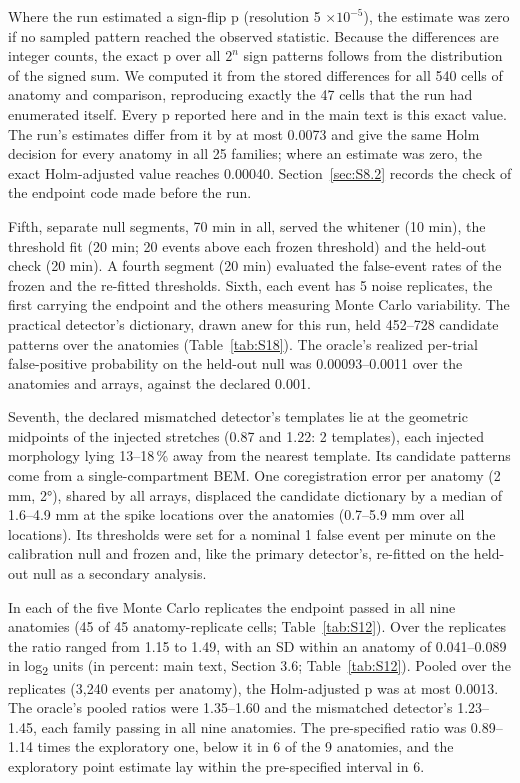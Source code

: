 \documentclass[preprint,12pt,authoryear,a4paper]{elsarticle}
\begin{document}
Where the run estimated a sign-flip p (resolution 5 $\times 10^{-5}$), the estimate was zero if no sampled pattern reached the observed statistic. Because the differences are integer counts, the exact p over all $2^{n}$ sign patterns follows from the distribution of the signed sum. We computed it from the stored differences for all 540 cells of anatomy and comparison, reproducing exactly the 47 cells that the run had enumerated itself. Every p reported here and in the main text is this exact value. The run's estimates differ from it by at most 0.0073 and give the same Holm decision for every anatomy in all 25 families; where an estimate was zero, the exact Holm-adjusted value reaches 0.00040. Section~\ref{sec:S8.2} records the check of the endpoint code made before the run.

Fifth, separate null segments, 70 min in all, served the whitener (10 min), the threshold fit (20 min; 20 events above each frozen threshold) and the held-out check (20 min). A fourth segment (20 min) evaluated the false-event rates of the frozen and the re-fitted thresholds. Sixth, each event has 5 noise replicates, the first carrying the endpoint and the others measuring Monte Carlo variability. The practical detector's dictionary, drawn anew for this run, held 452–728 candidate patterns over the anatomies (Table~\ref{tab:S18}). The oracle's realized per-trial false-positive probability on the held-out null was 0.00093–0.0011 over the anatomies and arrays, against the declared 0.001.

Seventh, the declared mismatched detector's templates lie at the geometric midpoints of the injected stretches (0.87 and 1.22: 2 templates), each injected morphology lying 13–18\,\% away from the nearest template. Its candidate patterns come from a single-compartment BEM. One coregistration error per anatomy (2 mm, 2°), shared by all arrays, displaced the candidate dictionary by a median of 1.6–4.9 mm at the spike locations over the anatomies (0.7–5.9 mm over all locations). Its thresholds were set for a nominal 1 false event per minute on the calibration null and frozen and, like the primary detector's, re-fitted on the held-out null as a secondary analysis.

In each of the five Monte Carlo replicates the endpoint passed in all nine anatomies (45 of 45 anatomy-replicate cells; Table~\ref{tab:S12}). Over the replicates the ratio ranged from 1.15 to 1.49, with an SD within an anatomy of 0.041–0.089 in log\textsubscript{2} units (in percent: main text, Section 3.6; Table~\ref{tab:S12}). Pooled over the replicates (3,240 events per anatomy), the Holm-adjusted p was at most 0.0013. The oracle's pooled ratios were 1.35–1.60 and the mismatched detector's 1.23–1.45, each family passing in all nine anatomies. The pre-specified ratio was 0.89–1.14 times the exploratory one, below it in 6 of the 9 anatomies, and the exploratory point estimate lay within the pre-specified interval in 6.
\end{document}
